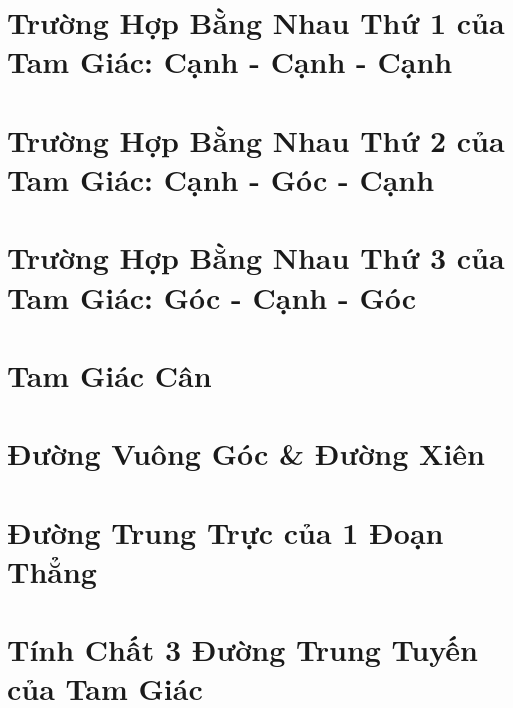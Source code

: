 \documentclass{article}
\numberwithin{equation}{section}
\begin{document}
\section{Trường Hợp Bằng Nhau Thứ 1 của Tam Giác: Cạnh - Cạnh - Cạnh}


\section{Trường Hợp Bằng Nhau Thứ 2 của Tam Giác: Cạnh - Góc - Cạnh}


\section{Trường Hợp Bằng Nhau Thứ 3 của Tam Giác: Góc - Cạnh - Góc}


\section{Tam Giác Cân}


\section{Đường Vuông Góc \& Đường Xiên}


\section{Đường Trung Trực của 1 Đoạn Thẳng}


\section{Tính Chất 3 Đường Trung Tuyến của Tam Giác}

\end{document}
